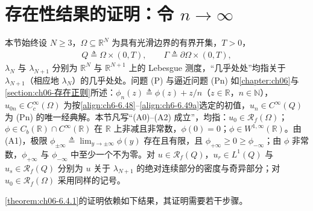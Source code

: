 \documentclass[../../main.tex]{subfiles}%
\begin{document}
\section{存在性结果的证明：令 $n\to\infty$}\label{section:ch06-令n趋于无穷}

本节始终设 $N\geqslant3$，$\Omega\subseteq\mathbb{R}^N$ 为具有光滑边界的有界开集，$T>0$，
\begin{align*}
Q\triangleq\Omega\times(0,T),\qquad \Gamma\triangleq\partial\Omega\times(0,T),
\end{align*}
$\lambda_N$ 与 $\lambda_{N+1}$ 分别为 $\mathbb{R}^N$ 与 $\mathbb{R}^{N+1}$ 上的 Lebesgue 测度，“几乎处处”均指关于 $\lambda_{N+1}$（相应地 $\lambda_N$）的几乎处处。问题 (P) 与逼近问题 (Pn) 如\cref{chapter:ch06}与\cref{section:ch06-存在正则}所述：$\phi_n(z)\triangleq\phi(z)+z/n$（$z\in\mathbb{R}$，$n\in\mathbb{N}$），$u_{0n}\in C^\infty_c(\Omega)$ 为按\eqref{align:ch6-6.48}--\eqref{align:ch6-6.49a}选定的初值，$u_n\in C^\infty(Q)$ 为 (Pn) 的唯一经典解。本节凡写“(A0)--(A2) 成立”，均指：$u_0\in\mathscr{R}_f(\Omega)$；$\phi\in C_b(\mathbb{R})\cap C^\infty(\mathbb{R})$ 在 $\mathbb{R}$ 上非减且非常数，$\phi(0)=0$；$\phi\in W^{1,\infty}(\mathbb{R})$。由 (A1)，极限 $\phi_{\pm\infty}\triangleq\lim_{y\to\pm\infty}\phi(y)$ 存在且有限，且 $\phi_{+\infty}\geqslant0\geqslant\phi_{-\infty}$；由 $\phi$ 非常数，$\phi_{+\infty}$ 与 $\phi_{-\infty}$ 中至少一个不为零。对 $u\in\mathscr{R}_f(Q)$，$u_r\in L^1(Q)$ 与 $u_s\in\mathscr{R}_f(Q)$ 分别为 $u$ 关于 $\lambda_{N+1}$ 的绝对连续部分的密度与奇异部分；对 $u_0\in\mathscr{R}_f(\Omega)$ 采用同样的记号。

\cref{theorem:ch06-6.4.1}的证明依赖如下结果，其证明需要若干步骤。
\end{document}
